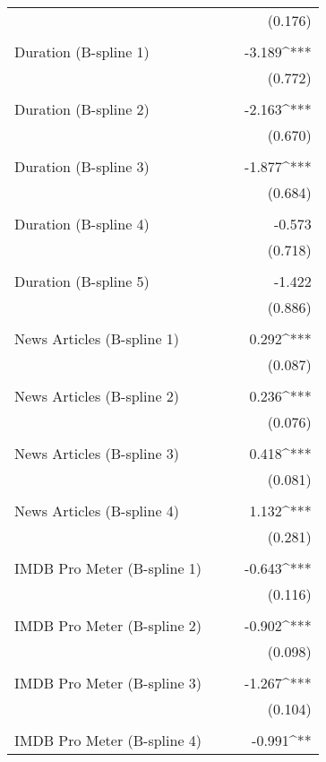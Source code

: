 \documentclass{article}
\begin{document}
\begin{table}[!htbp]
\begin{tabular}{@{\extracolsep{5pt}}lD{.}{.}{-3} D{.}{.}{-3} D{.}{.}{-3}}
  &  &  & (0.176) \\ 
  & & & \\ 
 Duration (B-spline 1) &  &  & -3.189^{***} \\ 
  &  &  & (0.772) \\ 
  & & & \\ 
 Duration (B-spline 2) &  &  & -2.163^{***} \\ 
  &  &  & (0.670) \\ 
  & & & \\ 
 Duration (B-spline 3) &  &  & -1.877^{***} \\ 
  &  &  & (0.684) \\ 
  & & & \\ 
 Duration (B-spline 4) &  &  & -0.573 \\ 
  &  &  & (0.718) \\ 
  & & & \\ 
 Duration (B-spline 5) &  &  & -1.422 \\ 
  &  &  & (0.886) \\ 
  & & & \\ 
 News Articles (B-spline 1) &  &  & 0.292^{***} \\ 
  &  &  & (0.087) \\ 
  & & & \\ 
 News Articles (B-spline 2) &  &  & 0.236^{***} \\ 
  &  &  & (0.076) \\ 
  & & & \\ 
 News Articles (B-spline 3) &  &  & 0.418^{***} \\ 
  &  &  & (0.081) \\ 
  & & & \\ 
 News Articles (B-spline 4) &  &  & 1.132^{***} \\ 
  &  &  & (0.281) \\ 
  & & & \\ 
 IMDB Pro Meter (B-spline 1) &  &  & -0.643^{***} \\ 
  &  &  & (0.116) \\ 
  & & & \\ 
 IMDB Pro Meter (B-spline 2) &  &  & -0.902^{***} \\ 
  &  &  & (0.098) \\ 
  & & & \\ 
 IMDB Pro Meter (B-spline 3) &  &  & -1.267^{***} \\ 
  &  &  & (0.104) \\ 
  & & & \\ 
 IMDB Pro Meter (B-spline 4) &  &  & -0.991^{**} \\ 

\end{tabular}
\end{table}
\end{document}

